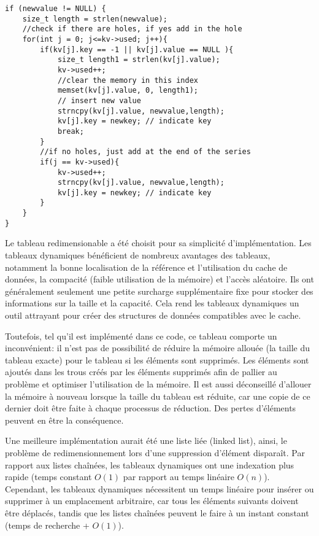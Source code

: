 \documentclass[11pt,a4paper]{article}
\begin{document}
\begin{lstlisting}
if (newvalue != NULL) {
	size_t length = strlen(newvalue);
	//check if there are holes, if yes add in the hole
	for(int j = 0; j<=kv->used; j++){
		if(kv[j].key == -1 || kv[j].value == NULL ){
			size_t length1 = strlen(kv[j].value);
			kv->used++;
			//clear the memory in this index
			memset(kv[j].value, 0, length1); 
			// insert new value
			strncpy(kv[j].value, newvalue,length); 
			kv[j].key = newkey; // indicate key
			break;
		}
		//if no holes, just add at the end of the series
		if(j == kv->used){
			kv->used++;
			strncpy(kv[j].value, newvalue,length); 
			kv[j].key = newkey; // indicate key
		}
	}
}
\end{lstlisting}

Le tableau redimensionable a été choisit pour sa simplicité d'implémentation. Les tableaux dynamiques bénéficient de nombreux avantages des tableaux, notamment la bonne localisation de la référence et l'utilisation du cache de données, la compacité (faible utilisation de la mémoire) et l'accès aléatoire. Ils ont généralement seulement une petite surcharge supplémentaire fixe pour stocker des informations sur la taille et la capacité. Cela rend les tableaux dynamiques un outil attrayant pour créer des structures de données compatibles avec le cache.

Toutefois, tel qu'il est implémenté dans ce code, ce tableau comporte un inconvénient: il n'est pas de possibilité de réduire la mémoire allouée (la taille du tableau exacte) pour le tableau si les éléments sont supprimés. Les éléments sont ajoutés dans les trous créés par les éléments supprimés afin de pallier au problème et optimiser l'utilisation de la mémoire. Il est aussi déconseillé d'allouer la mémoire à nouveau lorsque la taille du tableau est réduite, car une copie de ce dernier doit être faite à chaque processus de réduction. Des pertes d'éléments peuvent en être la conséquence.

Une meilleure implémentation aurait été une liste liée (linked list), ainsi, le problème de redimensionnement lors d'une suppression d'élément disparaît. Par rapport aux listes chaînées, les tableaux dynamiques ont une indexation plus rapide (temps constant $O(1)$ par rapport au temps linéaire $O(n)$). Cependant, les tableaux dynamiques nécessitent un temps linéaire pour insérer ou supprimer à un emplacement arbitraire, car tous les éléments suivants doivent être déplacés, tandis que les listes chaînées peuvent le faire à un instant constant (temps de recherche + $O(1)$).
\end{document}
